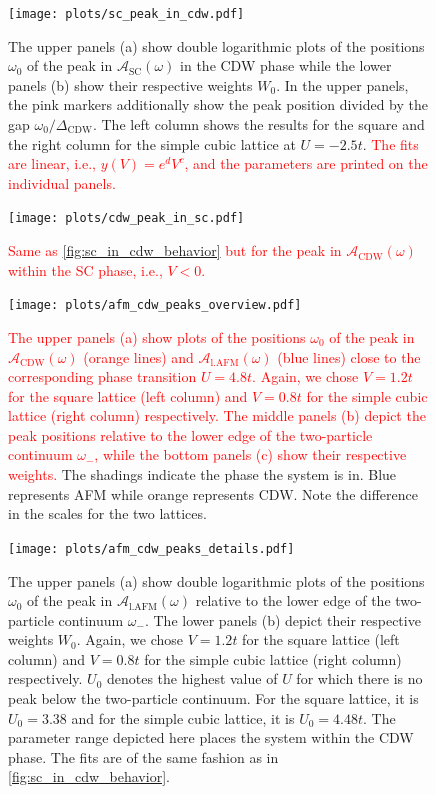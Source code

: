 \documentclass[
    reprint, 
    aps,
    preprintnumbers,
    twocolumn,
    prb,
    superscriptaddress
]{revtex4-2}
\newcommand{\spectral}[1]{\mathcal{A}_\text{#1}  (\omega)}
\begin{document}
\begin{figure}
    \centering
    \texttt{[image: plots/sc\_peak\_in\_cdw.pdf]}
    \caption{The upper panels (a) show double logarithmic plots of the positions $\omega_0$ of the peak in $\spectral{SC}$ in the CDW phase while the lower panels (b) show their respective weights $W_0$.
    In the upper panels, the pink markers additionally show the peak position divided by the gap $\omega_0 / \Delta_\text{CDW}$.
    The left column shows the results for the square and the right column for the simple cubic lattice at $U=-2.5t$.
    \textcolor{red}{The fits are linear, i.e., $y(V) = e^d V^c$, and the parameters are printed on the individual panels.}}
    \label{fig:sc_in_cdw_behavior}
\end{figure}

\begin{figure}
    \centering
    \texttt{[image: plots/cdw\_peak\_in\_sc.pdf]}
    \caption{\textcolor{red}{Same as \autoref{fig:sc_in_cdw_behavior} but for the peak in $\spectral{CDW}$ within the SC phase, i.e., $V<0$.}}
    \label{fig:cdw_in_sc_behavior}
\end{figure}

\begin{figure}
    \centering
    \texttt{[image: plots/afm\_cdw\_peaks\_overview.pdf]}
    \caption{\textcolor{red}{The upper panels (a) show plots of the positions $\omega_0$ of the peak in $\spectral{CDW}$ (orange lines) and $\spectral{l.AFM}$ (blue lines) close to the corresponding phase transition $U = 4.8t$.
    Again, we chose $V=1.2t$ for the square lattice (left column) and $V=0.8t$ for the simple cubic lattice (right column) respectively.
    The middle panels (b) depict the peak positions relative to the lower edge of the two-particle continuum $\omega_-$, while the bottom panels (c) show their respective weights.}
    The shadings indicate the phase the system is in. Blue represents AFM while orange represents CDW.
    Note the difference in the scales for the two lattices.}
    \label{fig:afm_cdw_peaks_overview}
\end{figure}

\begin{figure}
    \centering
    \texttt{[image: plots/afm\_cdw\_peaks\_details.pdf]}
    \caption{The upper panels (a) show double logarithmic plots of the positions $\omega_0$ of the peak in $\spectral{l.AFM}$ relative to the lower edge of the two-particle continuum $\omega_-$.
    The lower panels (b) depict their respective weights $W_0$.
    Again, we chose $V=1.2t$ for the square lattice (left column) and $V=0.8t$ for the simple cubic lattice (right column) respectively.
    $U_0$ denotes the highest value of $U$ for which there is no peak below the two-particle continuum.
    For the square lattice, it is $U_0 = 3.38$ and for the simple cubic lattice, it is $U_0 = 4.48t$.
    The parameter range depicted here places the system within the CDW phase.
    The fits are of the same fashion as in \autoref{fig:sc_in_cdw_behavior}.}
    \label{fig:afm_cdw_peaks_details}
\end{figure}
\end{document}

